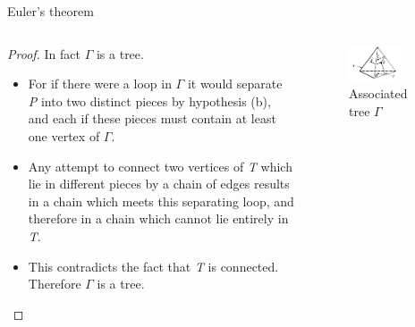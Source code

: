 \documentclass{beamer}
\begin{document}
\begin{frame}{Euler's theorem}
\begin{columns}
\begin{column}{0.6\textwidth}
  \begin{proof}
    In fact $\Gamma$ is a tree.
    \begin{itemize}
    \item For if there were a loop in $\Gamma$ it would separate \textsl{P} into two distinct pieces by hypothesis (b), and each if these pieces must contain at least one vertex of $\Gamma$.
    \item Any attempt to connect two vertices of \textsl{T} which lie in different pieces by a chain of edges results in a chain which  meets this separating loop, and therefore in a chain which cannot lie entirely in \textsl{T}.
    \item This contradicts the fact that \textsl{T} is connected. Therefore $\Gamma$ is a tree.
    \end{itemize}
  \end{proof}
\end{column}
\begin{column}{0.4\textwidth}
    \begin{figure}
    \centering
        \includegraphics[width=0.7\textwidth]{figure_1_5_c.png}
        \caption{Associated tree $\Gamma$}
    \end{figure}
\end{column}
\end{columns}
\end{frame}
\end{document}
